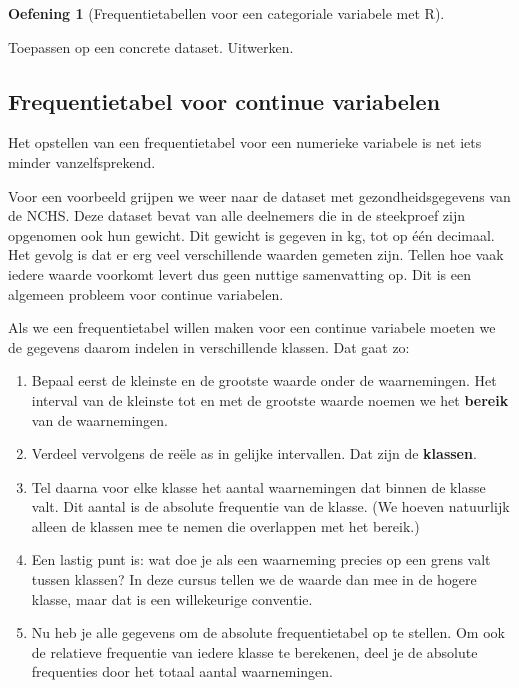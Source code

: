 \documentclass[
  a4paper,
]{scrbook}
\providecommand{\tightlist}{%
  \setlength{\itemsep}{0pt}\setlength{\parskip}{0pt}}\usepackage{longtable,booktabs,array}
\theoremstyle{definition}
\newtheorem{exercise}{Oefening}[chapter]
\theoremstyle{definition}
\theoremstyle{remark}
\begin{document}
\begin{exercise}[Frequentietabellen voor een categoriale variabele met
R]\protect\hypertarget{exr-freqtab}{}\label{exr-freqtab}

Toepassen op een concrete dataset. Uitwerken.

\end{exercise}

\subsection{Frequentietabel voor continue
variabelen}\label{frequentietabel-voor-continue-variabelen}

Het opstellen van een frequentietabel voor een numerieke variabele is
net iets minder vanzelfsprekend.

Voor een voorbeeld grijpen we weer naar de dataset met
gezondheidsgegevens van de NCHS. Deze dataset bevat van alle deelnemers
die in de steekproef zijn opgenomen ook hun gewicht. Dit gewicht is
gegeven in kg, tot op één decimaal. Het gevolg is dat er erg veel
verschillende waarden gemeten zijn. Tellen hoe vaak iedere waarde
voorkomt levert dus geen nuttige samenvatting op. Dit is een algemeen
probleem voor continue variabelen.

Als we een frequentietabel willen maken voor een continue variabele
moeten we de gegevens daarom indelen in verschillende klassen. Dat gaat
zo:

\begin{enumerate}
\def\labelenumi{\arabic{enumi}.}
\tightlist
\item
  Bepaal eerst de kleinste en de grootste waarde onder de waarnemingen.
  Het interval van de kleinste tot en met de grootste waarde noemen we
  het \textbf{bereik} van de waarnemingen.
\item
  Verdeel vervolgens de reële as in gelijke intervallen. Dat zijn de
  \textbf{klassen}.
\item
  Tel daarna voor elke klasse het aantal waarnemingen dat binnen de
  klasse valt. Dit aantal is de absolute frequentie van de klasse. (We
  hoeven natuurlijk alleen de klassen mee te nemen die overlappen met
  het bereik.)
\item
  Een lastig punt is: wat doe je als een waarneming precies op een grens
  valt tussen klassen? In deze cursus tellen we de waarde dan mee in de
  hogere klasse, maar dat is een willekeurige conventie.
\item
  Nu heb je alle gegevens om de absolute frequentietabel op te stellen.
  Om ook de relatieve frequentie van iedere klasse te berekenen, deel je
  de absolute frequenties door het totaal aantal waarnemingen.
\end{enumerate}
\end{document}
